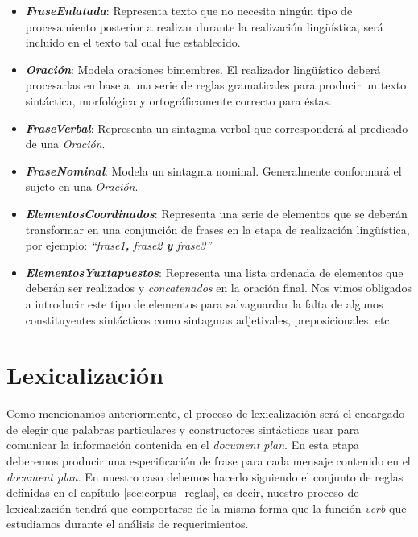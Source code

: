 \medskip
\begin{itemize}
\item{\emph{\textbf{FraseEnlatada}}: Representa texto que no necesita ningún tipo de procesamiento posterior a realizar durante la realización lingüística, será incluido en el texto tal cual fue establecido.}
\item{\emph{\textbf{Oración}}: Modela oraciones bimembres. El realizador lingüístico deberá procesarlas en base a una serie de reglas gramaticales para producir un texto sintáctica, morfológica y ortográficamente correcto para éstas.}
\item{\emph{\textbf{FraseVerbal}}: Representa un sintagma verbal que corresponderá al predicado de una \emph{Oración}.}
\item{\emph{\textbf{FraseNominal}}: Modela un sintagma nominal. Generalmente conformará el sujeto en una \emph{Oración}.}
\item{\emph{\textbf{ElementosCoordinados}}: Representa una serie de elementos que se deberán transformar en una conjunción de frases en la etapa de realización lingüística, por ejemplo: \emph{``frase1\textbf{,} frase2 \textbf{y} frase3''}}
\item{\emph{\textbf{ElementosYuxtapuestos}}: Representa una lista ordenada de elementos que deberán ser realizados y \emph{concatenados} en la oración final. Nos vimos obligados a introducir este tipo de elementos para salvaguardar la falta de algunos constituyentes sintácticos como sintagmas adjetivales, preposicionales, etc.}
\end{itemize}



\section{Lexicalización}
\label{sec:microplanning_lexicalization}

Como mencionamos anteriormente, el proceso de lexicalización será el encargado de elegir que palabras particulares y constructores sintácticos usar para comunicar la información contenida en el \textit{document plan}. En esta etapa deberemos producir una especificación de frase para cada mensaje contenido en el \textit{document plan}. En nuestro caso debemos hacerlo siguiendo el conjunto de reglas definidas en el capítulo \ref{sec:corpus_reglas}, es decir, nuestro proceso de lexicalización tendrá que comportarse de la misma forma que la función \emph{verb} que estudiamos durante el análisis de requerimientos.

